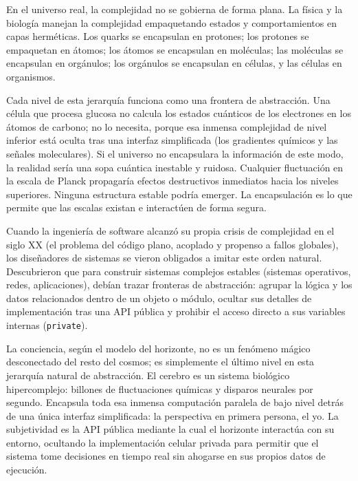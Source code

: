 En el universo real, la complejidad no se gobierna de forma plana. La física y la biología manejan la complejidad empaquetando estados y comportamientos en capas herméticas. Los quarks se encapsulan en protones; los protones se empaquetan en átomos; los átomos se encapsulan en moléculas; las moléculas se encapsulan en orgánulos; los orgánulos se encapsulan en células, y las células en organismos.

Cada nivel de esta jerarquía funciona como una frontera de abstracción. Una célula que procesa glucosa no calcula los estados cuánticos de los electrones en los átomos de carbono; no lo necesita, porque esa inmensa complejidad de nivel inferior está oculta tras una interfaz simplificada (los gradientes químicos y las señales moleculares). Si el universo no encapsulara la información de este modo, la realidad sería una sopa cuántica inestable y ruidosa. Cualquier fluctuación en la escala de Planck propagaría efectos destructivos inmediatos hacia los niveles superiores. Ninguna estructura estable podría emerger. La encapsulación es lo que permite que las escalas existan e interactúen de forma segura.

Cuando la ingeniería de software alcanzó su propia crisis de complejidad en el siglo XX (el problema del código plano, acoplado y propenso a fallos globales), los diseñadores de sistemas se vieron obligados a imitar este orden natural. Descubrieron que para construir sistemas complejos estables (sistemas operativos, redes, aplicaciones), debían trazar fronteras de abstracción: agrupar la lógica y los datos relacionados dentro de un objeto o módulo, ocultar sus detalles de implementación tras una API pública y prohibir el acceso directo a sus variables internas (\texttt{private}).

La conciencia, según el modelo del horizonte, no es un fenómeno mágico desconectado del resto del cosmos; es simplemente el último nivel en esta jerarquía natural de abstracción. El cerebro es un sistema biológico hipercomplejo: billones de fluctuaciones químicas y disparos neurales por segundo. Encapsula toda esa inmensa computación paralela de bajo nivel detrás de una única interfaz simplificada: la perspectiva en primera persona, el yo. La subjetividad es la API pública mediante la cual el horizonte interactúa con su entorno, ocultando la implementación celular privada para permitir que el sistema tome decisiones en tiempo real sin ahogarse en sus propios datos de ejecución.


